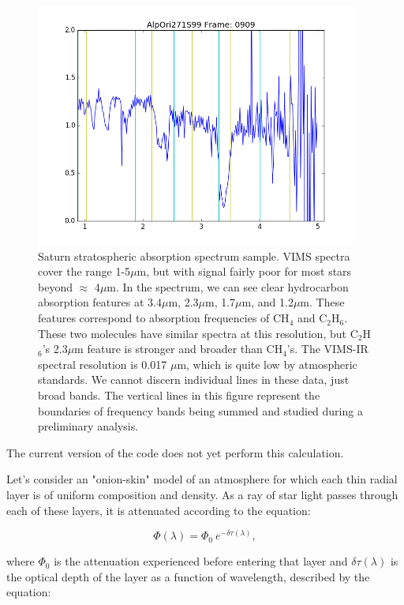 \documentclass[12pt]{article}
\begin{document}
\begin{figure}[h!]
  \centering
  \includegraphics[width=0.95\textwidth]{spectra0909.png}
  \caption{Saturn stratospheric absorption spectrum sample. VIMS spectra cover
the range 1-5$\mu$m, but with signal fairly poor for most stars beyond
$\approx$ 4$\mu$m. In the spectrum, we can see clear hydrocarbon absorption
features at 3.4$\mu$m, 2.3$\mu$m, 1.7$\mu$m, and 1.2$\mu$m.  These features
correspond to absorption frequencies of CH$_4$ and C$_2$H$_6$.  These two
molecules have similar spectra at this resolution, but C$_2$H$_6$'s 2.3$\mu$m
feature is stronger and broader than CH$_4$'s.  The VIMS-IR spectral resolution
is 0.017 $\mu$m, which is quite low by atmospheric standards. We cannot discern
individual lines in these data, just broad bands. The vertical lines in this
figure represent the boundaries of frequency bands being summed and studied
during a preliminary analysis.}
  \label{fig:spectrum}
\end{figure}

The current version of the code does not yet perform this calculation.

Let's consider an "onion-skin" model of an atmosphere for which each thin
radial layer is of uniform composition and density. As a ray of star light
passes through each of these layers, it is attenuated according to the
equation:

\begin{equation}
\Phi(\lambda) = \Phi_0\ e^{-\delta\tau(\lambda)},
\label{eq:abs_flux}
\end{equation}

\noindent where $\Phi_0$ is the attenuation experienced before entering that layer
and $\delta\tau(\lambda)$ is the optical depth of the layer as a function of
wavelength, described by the equation:
\end{document}
